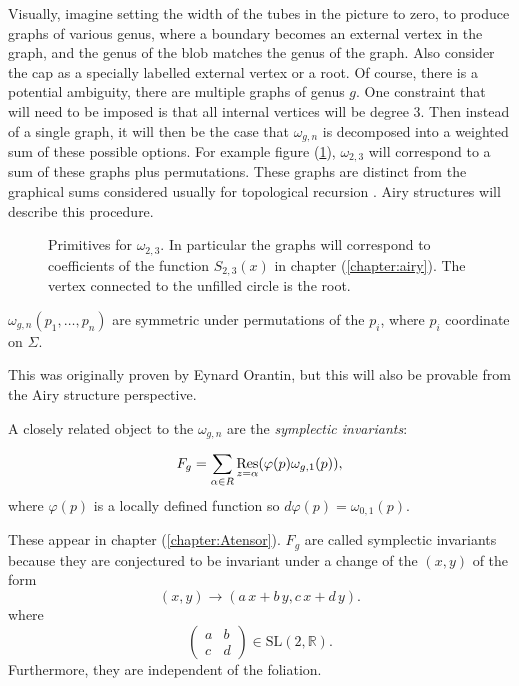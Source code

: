     Visually, imagine setting the width of the tubes in the picture to zero, to produce graphs of various genus, where a boundary becomes an external vertex in the graph, and the genus of the blob matches the genus of the graph. Also consider the cap as a specially labelled external vertex or a root. Of course, there is a potential ambiguity, there are multiple graphs of genus \(g\). One constraint that will need to be imposed is that all internal vertices will be degree \(3\). Then instead of a single graph, it will then be the case that \(\omega_{g,n}\) is decomposed into a weighted sum of these possible options. For example figure (\ref{fig:trprim}), \( \omega_{2,3}\) will correspond to a sum of these graphs plus permutations. These graphs are distinct from the graphical sums considered usually for topological recursion \cite{eynard_orantin}. Airy structures will describe this procedure. 
    \begin{figure}[!htb]
        \centering 
        
        \caption{Primitives for \( \omega_{2,3}\). In particular the graphs will correspond to coefficients of the function \( S_{2,3}(x)\) in chapter (\ref{chapter:airy}). The vertex connected to the unfilled circle is the root.}
        \label{fig:trprim}
    \end{figure}

    

    \begin{lem}
    \( \omega_{g,n}(p_1,\dots,p_n)\) are symmetric under permutations of the \(p_i\), where \( p_i\) coordinate on \( \Sigma\).
    \end{lem}
    This was originally proven by Eynard Orantin, but this will also be provable from the Airy structure perspective.
    
    A closely related object to the \( \omega_{g,n}\) are the \emph{symplectic invariants}:
    
    \begin{defn}
    \[ F_g = \sum_{\alpha \in R} \operatorname*{Res}_{z=\alpha}(\varphi(p) \omega_{g,1}(p) ),\]
    where \( \varphi(p)\) is a locally defined function so \( d \varphi(p) = \omega_{0,1}(p)\).
    \end{defn}

    These appear in chapter (\ref{chapter:Atensor}). \(F_g\) are called symplectic invariants because they are conjectured to be invariant under a change of the \( (x,y)\) of the form
    \[ ( x, y ) \rightarrow ( a \,x + b\, y, c\, x + d \,y ). \] 
    where 
    \[ \left( \begin{array}{cc}
         a & b   \\
         c & d 
    \end{array} \right) \in \mathrm{SL}(2, \mathbb{R} ). \]
    Furthermore, they are independent of the foliation.
    
